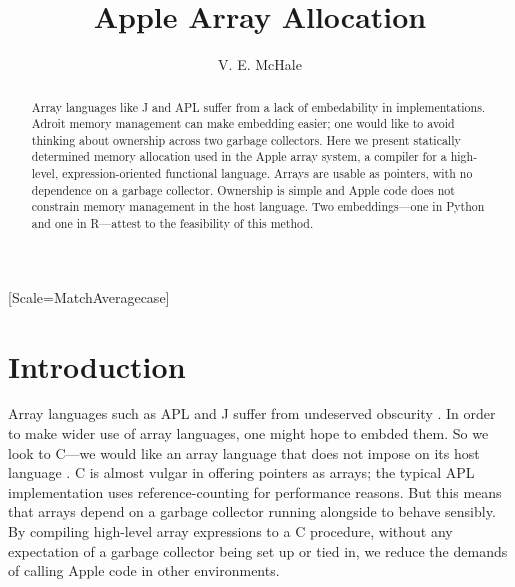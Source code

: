 \documentclass[sigplan,screen]{acmart}
\begin{document}
\setmonofont{Jet Brains Mono}[Scale=MatchAveragecase]



\begin{abstract}
    Array languages like J and APL suffer from a lack of embedability in implementations. Adroit memory management can make embedding easier; one would like to avoid thinking about ownership across two garbage collectors.
    Here we present statically determined memory allocation used in the Apple array system, a compiler for a high-level, expression-oriented functional language.
    Arrays are usable as pointers, with no dependence on a garbage collector.
    Ownership is simple and Apple code does not constrain memory management in the host language.
    Two embeddings---one in Python and one in R---attest to the feasibility of this method.
\end{abstract}

\title{Apple Array Allocation}
\author{V. E. McHale}
\maketitle

\section{Introduction}

Array languages such as APL and J suffer from undeserved obscurity \cite{hsu2023}. In order to make wider use of array languages, one might hope to embded them. So we look to C---we would like an array language that does not impose on its host language \cite{kell2017}.
C is almost vulgar in offering pointers as arrays; the typical APL implementation uses reference-counting \cite[p.~47]{hui2020} for performance reasons. But this means that arrays depend on a garbage collector running alongside to behave sensibly. By compiling high-level array expressions to a C procedure, without any expectation of a garbage collector being set up or tied in, we reduce the demands of calling Apple code in other environments.
\end{document}
